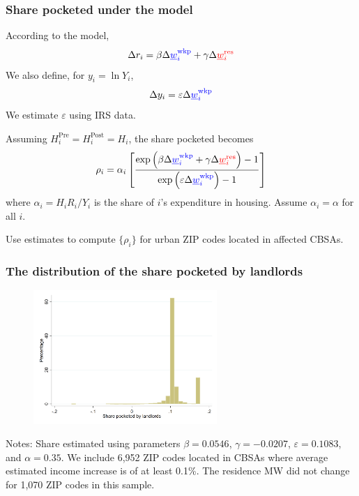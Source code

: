 \documentclass[aspectratio=169, t]{beamer}
\newcommand{\mw}{\underline{w}}
\newcommand{\wkp}{\text{wkp}}
\newcommand{\res}{\text{res}}
\newcommand{\pre}{\text{Pre}}
\newcommand{\post}{\text{Post}}
\begin{document}
\begin{frame}[label = share_pocketed_model]
    \frametitle{Share pocketed under the model}

    According to the model,
    $$
    \Delta r_i = \beta \Delta {\color{blue}\mw_i^{\wkp}} + \gamma \Delta {\color{red}\mw_i^{\res}}
    $$
    We also define, for $y_i = \ln Y_i$,
    $$
    \Delta y_i = \varepsilon \Delta {\color{blue}\mw_i^{\wkp}}
    $$
    We estimate $\varepsilon$ using IRS data. \hyperlink{wages_results}{}

    \pause
    \vspace{3mm}
    Assuming $H^{\pre}_i = H^{\post}_i = H_i$, the share pocketed becomes
    \begin{equation*}
        \rho_i = \alpha_i \left[
                  \frac{\exp \left( \beta \Delta {\color{blue}\mw_i^{\wkp}} 
                                 + \gamma \Delta {\color{red}\mw_i^{\res}} \right) - 1 }
                       {\exp \left( \varepsilon \Delta {\color{blue}\mw_i^{\wkp}}  \right) - 1 }
                         \right]
    \end{equation*}
    where $\alpha_i = H_i R_i / Y_i$ is the share of $i$'s expenditure in housing. Assume $\alpha_i = \alpha$ for all $i$.
    
    \pause
    \vspace{3mm}
    Use estimates to compute $\{\rho_i\}$ for urban ZIP codes located in affected CBSAs.
\end{frame}

\begin{frame}
    \frametitle{The distribution of the share pocketed by landlords}
    
    \vspace{1mm}
    \begin{figure}
        \centering
        \includegraphics[width = 0.62\textwidth]{counterfactuals/output/hist_rho.png}
    \end{figure}   

    \vspace{-1mm}
    \scriptsize
    Notes: Share estimated using parameters $\beta = 0.0546$, $\gamma = -0.0207$, $\varepsilon = 0.1083$, and $\alpha=0.35$.
    We include 6,952 ZIP codes located in CBSAs where average estimated income increase
    is of at least 0.1\%. 
    The residence MW did not change for 1,070 ZIP codes in this sample.
\end{frame}
\end{document}
